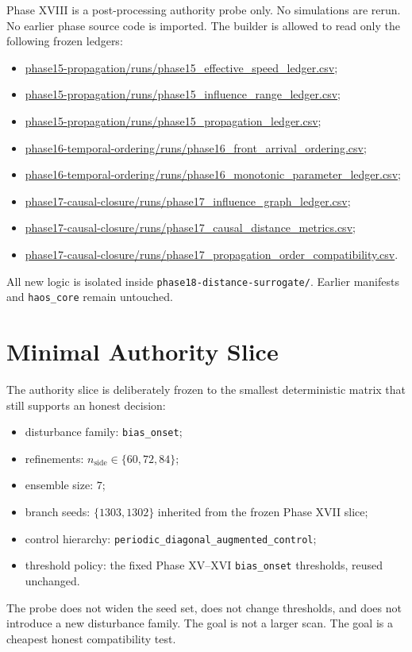 \documentclass[11pt]{article}
\begin{document}
Phase XVIII is a post-processing authority probe only. No simulations are rerun. No earlier phase source code is imported. The builder is allowed to read only the following frozen ledgers:
\begin{itemize}
\item \url{phase15-propagation/runs/phase15_effective_speed_ledger.csv};
\item \url{phase15-propagation/runs/phase15_influence_range_ledger.csv};
\item \url{phase15-propagation/runs/phase15_propagation_ledger.csv};
\item \url{phase16-temporal-ordering/runs/phase16_front_arrival_ordering.csv};
\item \url{phase16-temporal-ordering/runs/phase16_monotonic_parameter_ledger.csv};
\item \url{phase17-causal-closure/runs/phase17_influence_graph_ledger.csv};
\item \url{phase17-causal-closure/runs/phase17_causal_distance_metrics.csv};
\item \url{phase17-causal-closure/runs/phase17_propagation_order_compatibility.csv}.
\end{itemize}

All new logic is isolated inside \texttt{phase18-distance-surrogate/}. Earlier manifests and \texttt{haos\_core} remain untouched.

\section{Minimal Authority Slice}

The authority slice is deliberately frozen to the smallest deterministic matrix that still supports an honest decision:
\begin{itemize}
\item disturbance family: \texttt{bias\_onset};
\item refinements: $n_{\mathrm{side}} \in \{60,72,84\}$;
\item ensemble size: $7$;
\item branch seeds: $\{1303,1302\}$ inherited from the frozen Phase XVII slice;
\item control hierarchy: \texttt{periodic\_diagonal\_augmented\_control};
\item threshold policy: the fixed Phase XV--XVI \texttt{bias\_onset} thresholds, reused unchanged.
\end{itemize}

The probe does not widen the seed set, does not change thresholds, and does not introduce a new disturbance family. The goal is not a larger scan. The goal is a cheapest honest compatibility test.
\end{document}
